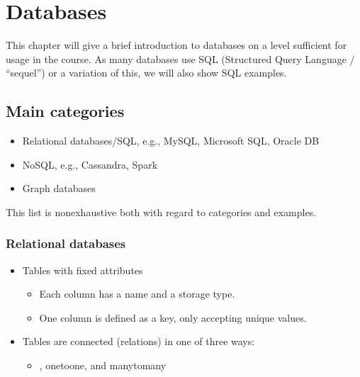 \documentclass[letterpaper,10pt,english]{jupyterBook}
\begin{document}
\chapter{Databases}
\label{\detokenize{2_Data_sources/Databases/Databases:databases}}\label{\detokenize{2_Data_sources/Databases/Databases::doc}}
\sphinxAtStartPar
This chapter will give a brief introduction to databases on a level sufficient for usage in the course. As many databases use SQL (Structured Query Language / “sequel”) or a variation of this, we will also show SQL examples.


\section{Main categories}
\label{\detokenize{2_Data_sources/Databases/Databases:main-categories}}\begin{itemize}
\item {} 
\sphinxAtStartPar
Relational databases/SQL, e.g., MySQL, Microsoft SQL, Oracle DB

\item {} 
\sphinxAtStartPar
NoSQL, e.g., Cassandra, Spark

\item {} 
\sphinxAtStartPar
Graph databases

\end{itemize}

\sphinxAtStartPar
This list is non\sphinxhyphen{}exhaustive both with regard to categories and examples.


\subsection{Relational databases}
\label{\detokenize{2_Data_sources/Databases/Databases:relational-databases}}\begin{itemize}
\item {} 
\sphinxAtStartPar
Tables with fixed attributes
\begin{itemize}
\item {} 
\sphinxAtStartPar
Each column has a name and a storage type.

\item {} 
\sphinxAtStartPar
One column is defined as a key, only accepting unique values.

\end{itemize}

\item {} 
\sphinxAtStartPar
Tables are connected (relations) in one of three ways:
\begin{itemize}
\item {} 
\sphinxAtStartPar
{}, one\sphinxhyphen{}to\sphinxhyphen{}one, and many\sphinxhyphen{}to\sphinxhyphen{}many

\end{itemize}

\end{itemize}
\end{document}
